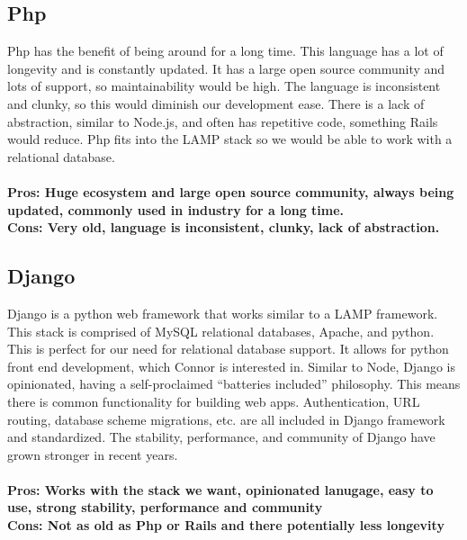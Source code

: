 \documentclass[draftclsnofoot,onecolumn,letterpaper,10pt,compsoc]{IEEEtran}
\begin{document}
			\subsection{Php}
			Php has the benefit of being around for a long time\cite{InfoWorldPhp}.
			This language has a lot of longevity and is constantly updated. It has a large open source community and lots of support, so maintainability would be high\cite{Medium}.
			The language is inconsistent and clunky, so this would diminish our development ease.
			There is a lack of abstraction, similar to Node.js, and often has repetitive code\cite{RailsApps}, something Rails would reduce.
			Php fits into the LAMP stack so we would be able to work with a relational database.
				\\ \\
				\textbf{Pros: Huge ecosystem and large open source community, always being updated, commonly used in industry for a long time.}
				\\
				\textbf{Cons: Very old, language is inconsistent, clunky, lack of abstraction.}

		\subsection{Django}
				Django is a python web framework that works similar to a LAMP framework.
				This stack is comprised of MySQL relational databases, Apache, and python\cite{Bitnami}.
				This is perfect for our need for relational database support. It allows for python front end development, which Connor is interested in.
				Similar to Node, Django is opinionated, having a self-proclaimed “batteries included” philosophy\cite{FullStackPython}.
				This means there is common functionality for building web apps. Authentication, URL routing, database scheme migrations, etc. are all included in Django framework and standardized\cite{FullStackPython}.
				The stability, performance, and community of Django have grown stronger in recent years\cite{FullStackPython}.
				\\ \\
				\textbf{Pros: Works with the stack we want, opinionated lanugage, easy to use, strong stability, performance and community }
				\\
				\textbf{Cons: Not as old as Php or Rails and there potentially less longevity}
\end{document}
